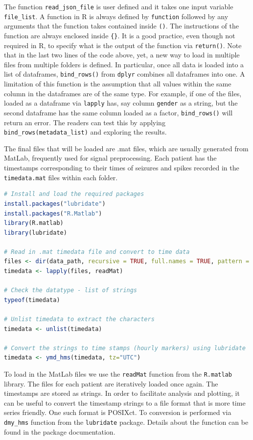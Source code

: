 The function \verb|read_json_file| is user defined and it takes one input variable \verb|file_list|. A function in R is always defined by \verb|function| followed by any arguments that the function takes contained inside \verb|()|. The instructions of the function are always enclosed inside \verb|{}|. It is a good practice, even though not required in R, to specify what is the output of the function via \verb|return()|.
Note that in the last two lines of the code above, yet, a new way to load in multiple files from multiple folders is defined. In particular, once all data is loaded into a list of dataframes, \verb|bind_rows()| from \verb|dplyr| \cite{dplyr} combines all dataframes into one. A limitation of this function is the assumption that all values within the same column in the dataframes are of the same type. For example, if one of the files, loaded as a dataframe via \verb|lapply| has, say column \verb|gender| as a string, but the second dataframe has the same column loaded as a factor, \verb|bind_rows()| will return an error. The readers can test this by applying \verb|bind_rows(metadata_list)| and exploring the results.

The final files that will be loaded are .mat files, which are usually generated from MatLab, frequently used for signal preprocessing. Each patient has the timestamps corresponding to their times of seizures and spikes recorded in the \verb|timedata.mat| files within each folder.
\begin{lstlisting}[language=R]
# Install and load the required packages
install.packages("lubridate")
install.packages("R.Matlab")
library(R.matlab)
library(lubridate)

# Read in .mat timedata file and convert to time data
files <- dir(data_path, recursive = TRUE, full.names = TRUE, pattern = "timedata.mat$")
timedata <- lapply(files, readMat)

# Check the datatype - list of strings
typeof(timedata)

# Unlist timedata to extract the characters
timedata <- unlist(timedata)

# Convert the strings to time stamps (hourly markers) using lubridate
timedata <- ymd_hms(timedata, tz="UTC")
\end{lstlisting}
To load in the MatLab files we use the \verb|readMat| function from the \verb|R.matlab| \cite{R.matlab} library. The files for each patient are iteratively loaded once again. The timestamps are stored as strings. In order to facilitate analysis and plotting, it can be useful to convert the timestamp strings to a file format that is more time series friendly. One such format is POSIXct. To conversion is performed via \verb|dmy_hms| function from the \verb|lubridate| \cite{lubridate} package. Details about the function can be found in the package documentation.

